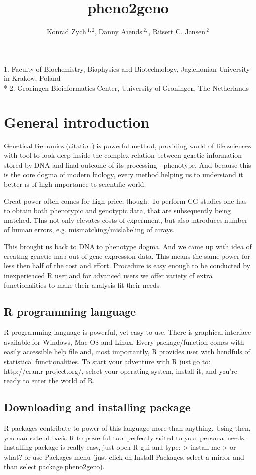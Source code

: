 \documentclass{article}
\begin{document}
\title {pheno2geno}
\author{
Konrad Zych\,$^{1,2}$, 
Danny Arends\,$^{2,}$,
 Ritsert C. Jansen\,$^{2}$
}
\maketitle
{\noindent}1. Faculty of Biochemistry, Biophysics and Biotechnology, Jagiellonian University in Krakow, Poland \\*
2. Groningen Bioinformatics Center, University of Groningen, The Netherlands

\newpage
\section{General introduction}

{\noindent}Genetical Genomics (citation) is powerful method, providing world of life sciences with tool to look deep inside the complex relation between genetic information stored by DNA and final outcome of its processing - phenotype. And because this is the core dogma of modern biology, every method helping us to understand it better is of high importance to scientific world. 

{\noindent}Great power often comes for high price, though. To perform GG studies one has to obtain both phenotypic and genotypic data, that are subsequently being matched. This not only elevates costs of experiment, but also introduces number of human errors, e.g. mismatching/mislabeling of arrays.

{\noindent}This brought us back to DNA to phenotype dogma. And we came up with idea of creating genetic map out of gene expression data. This means the same power for less then half of the cost and effort. Procedure is easy enough to be conducted by inexperienced R user and for advanced users we offer variety of extra functionalities to make their analysis fit their needs.
\subsection{R programming language}
R programming language is powerful, yet easy-to-use. There is graphical interface available for Windows, Mac OS and Linux. Every package/function comes with easily accessible help file and, most importantly, R provides user with handfuls of statistical functionalities. To start your adventure with R just go to: http://cran.r-project.org/, select your operating system, install it, and you're ready to enter the world of R.
\subsection{Downloading and installing package}
R packages contribute to power of this language more than anything. Using then, you can extend basic R to powerful tool perfectly suited to your personal needs. Installing package is really easy, just open R gui and type:
> install me
> or what?
or use Packages menu (just click on Install Packages, select a mirror and than select package pheno2geno).
\end{document}
